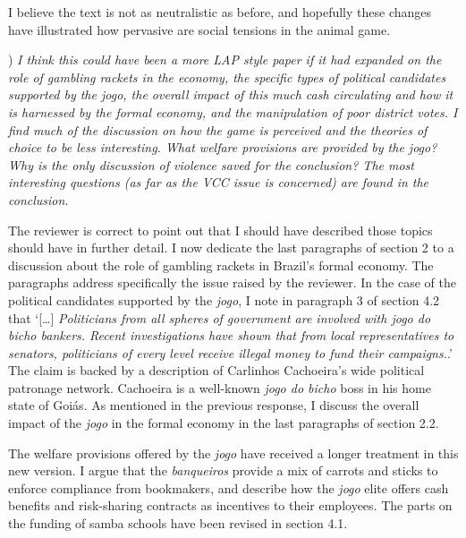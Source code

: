 \documentclass[a4paper,12pt]{article}
\begin{document}
I believe the text is not as neutralistic as before, and hopefully these changes have illustrated how pervasive are social tensions in the animal game.   

\vspace{.5cm}

) \textit{I think this could have been a more LAP style paper if it had expanded on the role of gambling rackets in the economy, the specific types of political candidates supported by the jogo, the overall impact of this much cash circulating and how it is harnessed by the formal economy, and the manipulation of poor district votes. I find much of the discussion on how the game is perceived and the theories of choice to be less interesting. What welfare provisions are provided by the jogo? Why is the only discussion of violence saved for the conclusion? The most interesting questions (as far as the VCC issue is concerned) are found in the conclusion.}

\vspace{.25cm}

The reviewer is correct to point out that I should have described those topics should have in further detail. I now dedicate the last paragraphs of section 2 to a discussion about the role of gambling rackets in Brazil's formal economy. The paragraphs address specifically the issue raised by the reviewer. In the case of the political candidates supported by the \textit{jogo}, I note in paragraph 3 of  section 4.2 that `[\dots] \textit{Politicians from all spheres of government are involved with jogo do bicho bankers. Recent investigations have shown that from local representatives to senators, politicians of every level receive illegal money to fund their campaigns.}.' The claim is backed by a description of Carlinhos Cachoeira's wide political patronage network. Cachoeira is a well-known \textit{jogo do bicho} boss in his home state of Goiás. As mentioned in the previous response, I discuss the overall impact of the \textit{jogo} in the formal economy in the last paragraphs of section 2.2.  

The welfare provisions offered by the \textit{jogo} have received a longer treatment in this new version. I argue that the \textit{banqueiros} provide a mix of carrots and sticks to enforce compliance from bookmakers, and describe how the \textit{jogo} elite offers cash benefits and risk-sharing contracts as incentives to their employees. The parts on the funding of samba schools have been revised in section 4.1.    
\end{document}
